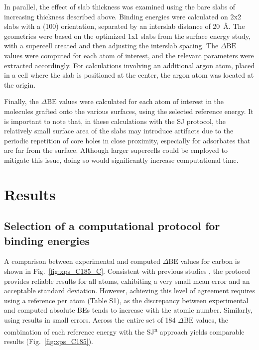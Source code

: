 \documentclass[journal=jpccck,manuscript=article]{achemso}
\def\dbe{\ensuremath{\Delta\text{BE}}}
\begin{document}
In parallel, the effect of slab thickness was examined using the bare slabs of increasing thickness described above. Binding energies were calculated on 2x2 slabs with a (100) orientation, separated by an interslab distance of \SI{20}{\angstrom}. The geometries were based on the optimized 1x1 slabs from the surface energy study, with a supercell created and then adjusting the interslab spacing. The \dbe{} values were computed for each atom of interest, and the relevant parameters were extracted accordingly. For calculations involving an additional argon atom, placed in a cell where the slab is positioned at the center, the argon atom was located at the origin.

Finally, the \dbe{} values were calculated for each atom of interest in the molecules grafted onto the various surfaces, using the selected reference energy. It is important to note that, in these calculations with the SJ protocol, the relatively small surface area of the slabs may introduce artifacts due to the periodic repetition of core holes in close proximity, especially for adsorbates that are far from the surface\cite{taucherFinalStateSimulationsCoreLevel2020}. Although larger supercells could be employed to mitigate this issue, doing so would significantly increase computational time.



\section{Results}


\subsection{Selection of a computational protocol for binding energies}

A comparison between experimental and computed \dbe{} values for carbon is shown in Fig.~\ref{fig:xps_C185_C}. Consistent with previous studies \cite{pueyobellafontPredictingCoreLevel2017,golzeAccurateAbsoluteRelative2020}, the  protocol provides reliable results for all atoms, exhibiting a very small mean error and an acceptable standard deviation. However, achieving this level of agreement requires using a reference per atom (Table S1), as the discrepancy between experimental and computed absolute BEs tends to increase with the atomic number. Similarly, using  results in small errors. Across the entire set of 184 \dbe{} values, the combination of each reference energy with the SJ\textsuperscript{n} approach yields comparable results (Fig.~\ref{fig:xps_C185}). 
\end{document}
